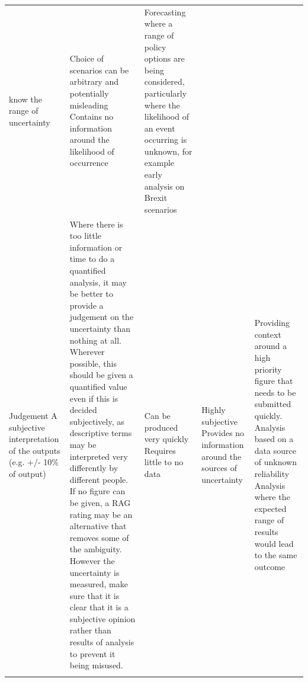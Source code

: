 \documentclass[]{book}
\begin{document}
\begin{longtable}[]{@{}lllll@{}}
\begin{minipage}[t]{0.16\columnwidth}
know the range of uncertainty\strut
\end{minipage} & \begin{minipage}[t]{0.16\columnwidth}\raggedright\strut
Choice of scenarios can be arbitrary and potentially misleading Contains
no information around the likelihood of occurrence\strut
\end{minipage} & \begin{minipage}[t]{0.13\columnwidth}\raggedright\strut
Forecasting where a range of policy options are being considered,
particularly where the likelihood of an event occurring is unknown, for
example early analysis on Brexit scenarios\strut
\end{minipage}\tabularnewline
\begin{minipage}[t]{0.16\columnwidth}\raggedright\strut
Judgement A subjective interpretation of the outputs (e.g. +/- 10\% of
output)\strut
\end{minipage} & \begin{minipage}[t]{0.26\columnwidth}\raggedright\strut
Where there is too little information or time to do a quantified
analysis, it may be better to provide a judgement on the uncertainty
than nothing at all. Wherever possible, this should be given a
quantified value even if this is decided subjectively, as descriptive
terms may be interpreted very differently by different people. If no
figure can be given, a RAG rating may be an alternative that removes
some of the ambiguity. However the uncertainty is measured, make sure
that it is clear that it is a subjective opinion rather than results of
analysis to prevent it being misused.\strut
\end{minipage} & \begin{minipage}[t]{0.16\columnwidth}\raggedright\strut
Can be produced very quickly Requires little to no data\strut
\end{minipage} & \begin{minipage}[t]{0.16\columnwidth}\raggedright\strut
Highly subjective Provides no information around the sources of
uncertainty\strut
\end{minipage} & \begin{minipage}[t]{0.13\columnwidth}\raggedright\strut
Providing context around a high priority figure that needs to be
submitted quickly. Analysis based on a data source of unknown
reliability Analysis where the expected range of results would lead to
the same outcome\strut
\end{minipage}\tabularnewline
\begin{minipage}[t]{0.16\columnwidth}\raggedright\strut

\end{minipage}
\end{longtable}
\end{document}
